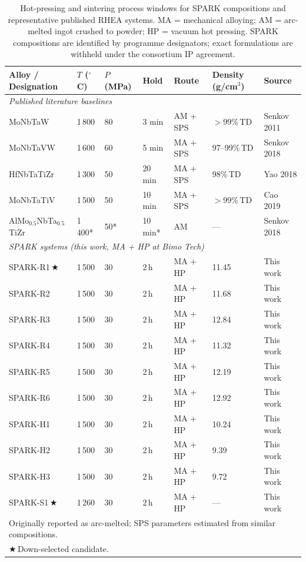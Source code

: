 \documentclass[11pt,a4paper]{article}
\begin{document}
\begin{landscape}
\begin{table}[p]
\centering
\caption{Hot-pressing and sintering process windows for SPARK compositions and representative published RHEA systems. MA = mechanical alloying; AM = arc-melted ingot crushed to powder; HP = vacuum hot pressing. SPARK compositions are identified by programme designators; exact formulations are withheld under the consortium IP agreement.}
\label{tab:sps_baselines}
\footnotesize
\begin{tabular}{lllllll}
\toprule
\textbf{Alloy / Designation} & \textbf{$T$ ($^{\circ}$C)} & \textbf{$P$ (MPa)} & \textbf{Hold} & \textbf{Route} & \textbf{Density (g/cm$^3$)} & \textbf{Source} \\
\midrule
\multicolumn{7}{l}{\textit{Published literature baselines}} \\
MoNbTaW         & 1\,800 & 80 & 3 min  & AM + SPS  & $>$99\%\,TD  & Senkov 2011 \\
MoNbTaVW        & 1\,600 & 60 & 5 min  & MA + SPS  & 97--99\%\,TD & Senkov 2018 \\
HfNbTaTiZr      & 1\,300 & 50 & 20 min & MA + SPS  & 98\%\,TD     & Yao 2018 \\
MoNbTaTiV       & 1\,500 & 50 & 10 min & MA + SPS  & $>$99\%\,TD  & Cao 2019 \\
AlMo$_{0.5}$NbTa$_{0.5}$TiZr & 1\,400* & 50* & 10 min* & AM & --- & Senkov 2018 \\
\midrule
\multicolumn{7}{l}{\textit{SPARK systems (this work, MA + HP at Bimo Tech)}} \\
SPARK-R1\,$\bigstar$ & 1\,500 & 30 & 2\,h & MA + HP & 11.45 & This work \\
SPARK-R2        & 1\,500 & 30 & 2\,h & MA + HP & 11.68 & This work \\
SPARK-R3        & 1\,500 & 30 & 2\,h & MA + HP & 12.84 & This work \\
SPARK-R4        & 1\,500 & 30 & 2\,h & MA + HP & 11.32 & This work \\
SPARK-R5        & 1\,500 & 30 & 2\,h & MA + HP & 12.19 & This work \\
SPARK-R6        & 1\,500 & 30 & 2\,h & MA + HP & 12.92 & This work \\
SPARK-H1        & 1\,500 & 30 & 2\,h & MA + HP & 10.24 & This work \\
SPARK-H2        & 1\,500 & 30 & 2\,h & MA + HP &  9.39 & This work \\
SPARK-H3        & 1\,500 & 30 & 2\,h & MA + HP &  9.72 & This work \\
SPARK-S1\,$\bigstar$ & 1\,260 & 30 & 2\,h & MA + HP & --- & This work \\
\bottomrule
\multicolumn{7}{l}{\scriptsize *Originally reported as arc-melted; SPS parameters estimated from similar compositions.} \\
\multicolumn{7}{l}{\scriptsize $\bigstar$\,Down-selected candidate.}
\end{tabular}
\end{table}
\end{landscape}
\end{document}
